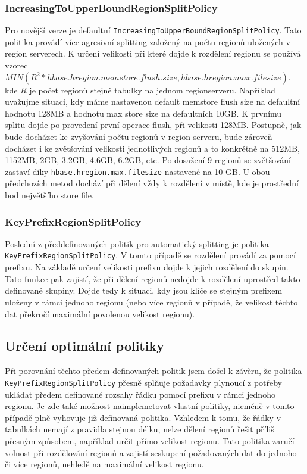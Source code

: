 \documentclass[thesis=M,czech]{FITthesis}[2012/06/26]
\begin{document}
\subsubsection{IncreasingToUpperBoundRegionSplitPolicy}
Pro novější verze je defaultní \texttt{IncreasingToUpperBoundRegionSplitPolicy}. Tato politika provádí více agresivní splitting  založený na počtu regionů uložených v region serverech. K určení velikosti při které dojde k rozdělení regionu se používá vzorec \\  $MIN(R^2 * hbase.hregion.memstore.flush.size,hbase.hregion.max.filesize)$. \\ kde $R$ je počet regionů stejné tabulky na jednom regionserveru. Například uvažujme situaci, kdy máme nastavenou default memstore flush size na defaultní hodnotu 128MB a hodnotu max store size na defaultních 10GB. K prvnímu splitu dojde po provedení první operace flush, při velikosti 128MB. Postupně, jak bude docházet ke zvyšování počtu regionů v region serveru, bude zároveň docházet i ke zvětšování velikosti jednotlivých regionů a to konkrétně na 512MB, 1152MB, 2GB, 3.2GB, 4.6GB, 6.2GB, etc. Po dosažení 9 regionů se zvětšování zastaví díky \texttt{hbase.hregion.max.filesize} nastavené na 10 GB. U obou předchozích metod dochází při dělení vždy k rozdělení v místě, kde je prostřední bod největšího store file.


\subsubsection{KeyPrefixRegionSplitPolicy}
Poslední z předdefinovaných politik pro automatický splitting je politika \\ \texttt{KeyPrefixRegionSplitPolicy}. V tomto případě se rozdělení provádí za pomocí prefixu. Na základě určení velikosti prefixu dojde k jejich rozdělení do skupin. Tato funkce pak zajistí, že při dělení regionů nedojde k rozdělení uprostřed takto definované skupiny. Dojde tedy k situaci, kdy jsou klíče se stejným prefixem uloženy v rámci jednoho regionu (nebo více regionů v případě, že velikost těchto dat překročí maximální povolenou velikost regionu).

\subsection{Určení optimální politiky}
Při porovnání těchto předem definovaných politik jsem došel k závěru, že politika \texttt{KeyPrefixRegionSplitPolicy} přesně splňuje požadavky plynoucí z potřeby ukládat předem definované rozsahy řádku pomocí prefixu v rámci jednoho regionu. Je zde také možnost naimplemetovat vlastní politiky, nicméně v tomto případě plně vyhovuje již definovaná politika. Vzhledem k tomu, že řádky v tabulkách nemají z pravidla stejnou délku, nelze dělení regionů řešit příliš přesným způsobem, například určit přímo velikost regionu. Tato politika zaručí volnost při rozdělování regionů a zajistí seskupení požadovaných dat do jednoho či více regionů, nehledě na maximální velikost regionu.
\end{document}
